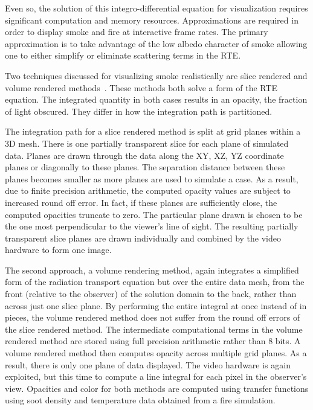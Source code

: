 Even so, the solution of this integro-differential equation for visualization requires significant computation and memory  resources.  Approximations are required in order to display smoke and fire at interactive frame rates.  The primary approximation is to take advantage of the low albedo character of smoke allowing one to either simplify or eliminate scattering terms in the RTE.

Two techniques discussed for visualizing smoke realistically are slice rendered and volume rendered methods~\cite{levoy:1988,Engel:2006}.    These methods both solve a form of the RTE equation.  The integrated quantity in both cases results in an opacity, the fraction of light obscured.  They differ in how the integration path is partitioned.

The integration path for a slice rendered method is split at grid planes within a 3D mesh. There is one partially transparent slice for each plane of simulated data. Planes are drawn through the data along the XY, XZ, YZ coordinate planes or diagonally to these  planes.   The separation distance between these planes becomes smaller as more planes are used to simulate a case.  As a result, due to finite precision arithmetic, the computed opacity values are subject to increased round off error.  In fact, if these planes are sufficiently close, the computed opacities truncate to zero.  The particular plane drawn is chosen to be the one most perpendicular to the viewer's line of sight.
The resulting partially transparent slice planes are drawn individually and combined by the video hardware to form one image.

The second approach, a volume rendering method, again integrates a simplified form of the radiation transport equation but over the entire data mesh, from the front (relative to the observer) of the solution domain to the back, rather than across just one slice plane. By performing the entire integral at once instead of in pieces, the volume rendered method does not suffer from the round off errors of the slice rendered method.  The intermediate computational terms in the volume rendered method are stored using full precision arithmetic rather than 8 bits.  A volume rendered method then computes opacity across multiple grid planes.  As a result, there is only one plane of data displayed.  The video hardware is again exploited, but this time to compute a line integral for each pixel in the observer's view.  Opacities and color for both methods are computed using transfer functions using soot density and temperature data obtained from a fire simulation.

